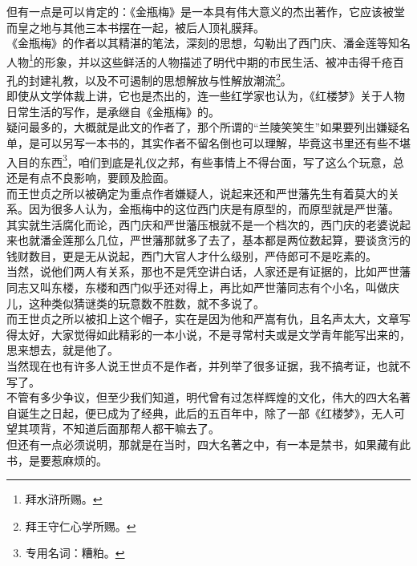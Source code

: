 \begin{multicols}{\theparacolNo}
但有一点是可以肯定的：《金瓶梅》是一本具有伟大意义的杰出著作，它应该被堂而皇之地与其他三本书摆在一起，被后人顶礼膜拜。\\

《金瓶梅》的作者以其精湛的笔法，深刻的思想，勾勒出了西门庆、潘金莲等知名人物\footnote{拜水浒所赐。}的形象，并以这些鲜活的人物描述了明代中期的市民生活、被冲击得千疮百孔的封建礼教，以及不可遏制的思想解放与性解放潮流\footnote{拜王守仁心学所赐。}。\\

即使从文学体裁上讲，它也是杰出的，连一些红学家也认为，《红楼梦》关于人物日常生活的写作，是承继自《金瓶梅》的。\\

疑问最多的，大概就是此文的作者了，那个所谓的“兰陵笑笑生”如果要列出嫌疑名单，是可以另写一本书的，其实作者不留名倒也可以理解，毕竟这书里还有些不堪入目的东西\footnote{专用名词：糟粕。}，咱们到底是礼仪之邦，有些事情上不得台面，写了这么个玩意，总还是有点不良影响，要顾及脸面。\\

而王世贞之所以被确定为重点作者嫌疑人，说起来还和严世藩先生有着莫大的关系。因为很多人认为，金瓶梅中的这位西门庆是有原型的，而原型就是严世藩。\\

其实就生活腐化而论，西门庆和严世藩压根就不是一个档次的，西门庆的老婆说起来也就潘金莲那么几位，严世藩那就多了去了，基本都是两位数起算，要谈贪污的钱财数目，更是无从说起，西门大官人才什么级别，严侍郎可不是吃素的。\\

当然，说他们两人有关系，那也不是凭空讲白话，人家还是有证据的，比如严世藩同志又叫东楼，东楼和西门似乎还对得上，再比如严世藩同志有个小名，叫做庆儿，这种类似猜谜类的玩意数不胜数，就不多说了。\\

而王世贞之所以被扣上这个帽子，实在是因为他和严嵩有仇，且名声太大，文章写得太好，大家觉得如此精彩的一本小说，不是寻常村夫或是文学青年能写出来的，思来想去，就是他了。\\

当然现在也有许多人说王世贞不是作者，并列举了很多证据，我不搞考证，也就不写了。\\

不管有多少争议，但至少我们知道，明代曾有过怎样辉煌的文化，伟大的四大名著自诞生之日起，便已成为了经典，此后的五百年中，除了一部《红楼梦》，无人可望其项背，不知道后面那帮人都干嘛去了。\\

但还有一点必须说明，那就是在当时，四大名著之中，有一本是禁书，如果藏有此书，是要惹麻烦的。\\


\end{multicols}
